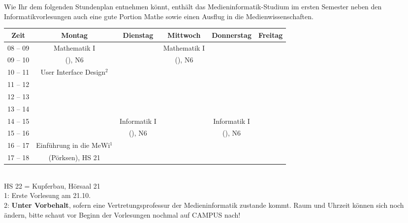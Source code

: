 
Wie Ihr dem folgenden Stundenplan entnehmen könnt, enthält das Medieninformatik-Studium im ersten
Semester neben den Informatikvorlesungen auch eine gute Portion Mathe sowie einen Ausflug in die Medienwissenschaften. 

\begin{center}
	\begin{tabular}{|c|c|c|c|c|c|} \hline
		Zeit      & 			Montag 		& Dienstag			& Mittwoch 			& Donnerstag 			& Freitag	 \\
		\hline\hline
		08 -- 09  & 		Mathematik I 	&  					& Mathematik I 		&  						&			\\
		\cline{1-1}\cline{3-3}\cline{5-6}
		09 -- 10  & 		(\Matheprof), N6& 					& (\Matheprof), N6  &  						&			\\
		\hline
		10 -- 11  &	User Interface Design$^2$	&				&					&						&			\\
		\cline{1-1}\cline{3-6}
		11 -- 12 & 	            			&  					&					&			 			& 			\\
		\hline
		12 -- 13 & 							&  					& 				    & 						& 			 \\
		\hline
		13 -- 14 & 							& 					&   				 & 						& 			 \\
		\hline
		14 -- 15 & 							& Informatik I 		& 					& Informatik I 			& 				\\
		\cline{1-2}\cline{4-4}\cline{6-6}
		15 -- 16 &							& (\Infoprof), N6 	& 					& (\Infoprof), N6 		& 				\\
		\hline
		16 -- 17 & Einführung in die MeWi$^1$ &  	 & 		&						&\\
		\cline{1-1}\cline{3-6}
		17 -- 18 & 	(Pörksen), HS 21 	 	&  &					& 						& \\
		\hline
	\end{tabular}\\
\scriptsize HS 22 = Kupferbau, Hörsaal 21 \\
1: Erste Vorlesung am 21.10.\\
2: \textbf{Unter Vorbehalt}, sofern eine Vertretungsprofessur der Medieninformatik zustande kommt. Raum und Uhrzeit können sich noch ändern, bitte schaut vor Beginn der Vorlesungen nochmal auf CAMPUS nach!

\end{center}

